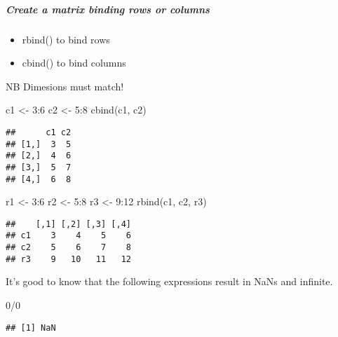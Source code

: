 \documentclass[
]{article}
\newenvironment{Shaded}{\begin{snugshade}}{\end{snugshade}}
\newcommand{\DecValTok}[1]{\textcolor[rgb]{0.00,0.00,0.81}{#1}}
\newcommand{\FunctionTok}[1]{\textcolor[rgb]{0.00,0.00,0.00}{#1}}
\newcommand{\NormalTok}[1]{#1}
\newcommand{\OtherTok}[1]{\textcolor[rgb]{0.56,0.35,0.01}{#1}}
\newcommand{\SpecialCharTok}[1]{\textcolor[rgb]{0.00,0.00,0.00}{#1}}
\providecommand{\tightlist}{%
  \setlength{\itemsep}{0pt}\setlength{\parskip}{0pt}}
\begin{document}
\hypertarget{create-a-matrix-binding-rows-or-columns}{%
\subparagraph{Create a matrix binding rows or
columns}\label{create-a-matrix-binding-rows-or-columns}}

\begin{itemize}
\tightlist
\item
  rbind() to bind rows\\
\item
  cbind() to bind columns
\end{itemize}

NB Dimesions must match!

\begin{Shaded}
\begin{Highlighting}[]
\NormalTok{c1 }\OtherTok{\textless{}{-}} \DecValTok{3}\SpecialCharTok{:}\DecValTok{6}
\NormalTok{c2 }\OtherTok{\textless{}{-}} \DecValTok{5}\SpecialCharTok{:}\DecValTok{8}
\FunctionTok{cbind}\NormalTok{(c1, c2)}
\end{Highlighting}
\end{Shaded}

\begin{verbatim}
##      c1 c2
## [1,]  3  5
## [2,]  4  6
## [3,]  5  7
## [4,]  6  8
\end{verbatim}

\begin{Shaded}
\begin{Highlighting}[]
\NormalTok{r1 }\OtherTok{\textless{}{-}} \DecValTok{3}\SpecialCharTok{:}\DecValTok{6}
\NormalTok{r2 }\OtherTok{\textless{}{-}} \DecValTok{5}\SpecialCharTok{:}\DecValTok{8}
\NormalTok{r3 }\OtherTok{\textless{}{-}} \DecValTok{9}\SpecialCharTok{:}\DecValTok{12}
\FunctionTok{rbind}\NormalTok{(c1, c2, r3)}
\end{Highlighting}
\end{Shaded}

\begin{verbatim}
##    [,1] [,2] [,3] [,4]
## c1    3    4    5    6
## c2    5    6    7    8
## r3    9   10   11   12
\end{verbatim}

It's good to know that the following expressions result in NaNs and
infinite.

\begin{Shaded}
\begin{Highlighting}[]
\DecValTok{0}\SpecialCharTok{/}\DecValTok{0}
\end{Highlighting}
\end{Shaded}

\begin{verbatim}
## [1] NaN
\end{verbatim}
\end{document}
